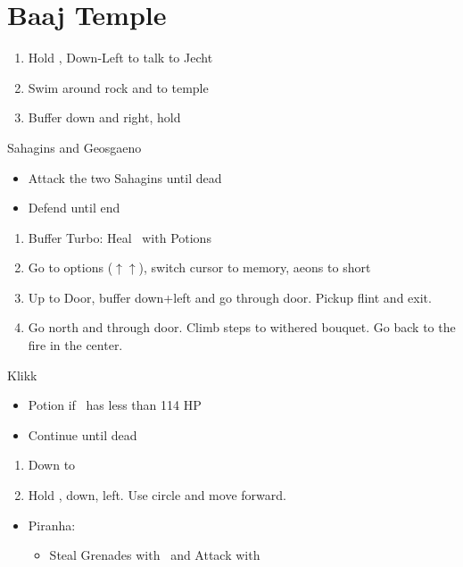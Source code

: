 \chapter{Baaj Temple}

\begin{enumerate}
    \item Hold \Cancel, Down-Left to talk to Jecht
    \item Swim around rock and to temple
    \item Buffer down and right, hold \Cancel
\end{enumerate}
\begin{battle}{Sahagins and Geosgaeno}
    \begin{itemize}
        \item Attack the two Sahagins until dead
        \item Defend until end
    \end{itemize}
\end{battle}
\begin{enumerate}[resume]
    \item Buffer Turbo: Heal \tidus\ with Potions
    \item Go to options ($\uparrow \uparrow$), switch cursor to memory, aeons to short
    \item Up to Door, buffer down+left and go through door. Pickup flint and exit.
    \item Go north and through door. Climb steps to withered bouquet. Go back to the fire in the center.
\end{enumerate}
\begin{battle}[1500]{Klikk}
    \begin{itemize}
        \tidusf Attack x6, Potion once \tidus\ has less than 227 HP
        \rikkuf Grenade x1, Steal x2 Grenades Total, Attack (need at least 6 Grenades for Tros)
        \tidusf Attack
        \item Potion if \tidus\ has less than 114 HP
        \item Continue until dead
    \end{itemize}
\end{battle}
\begin{enumerate}[resume]
    \item Down to \rikku\
    \item Hold \Cancel, down, left. Use circle and move forward.
\end{enumerate}
\begin{encounters}
    \begin{itemize}
        \item Piranha:
        \begin{itemize}
            \item Steal Grenades with \rikku\ and Attack with \tidus
        \end{itemize}
    \end{itemize}
\end{encounters}

